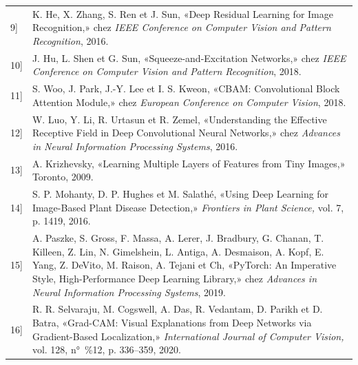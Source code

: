 \documentclass[
  12pt,
  a4paper,
]{report}
\begin{document}
\begin{longtable}[]{@{}
  >{\raggedright\arraybackslash}p{}
  >{\raggedright\arraybackslash}p{}@{}}
{[}9{]} & K. He, X. Zhang, S. Ren et J. Sun, «Deep Residual Learning for
Image Recognition,» chez \emph{IEEE Conference on Computer Vision and
Pattern Recognition}, 2016. \\
{[}10{]} & J. Hu, L. Shen et G. Sun, «Squeeze-and-Excitation Networks,»
chez \emph{IEEE Conference on Computer Vision and Pattern Recognition},
2018. \\
{[}11{]} & S. Woo, J. Park, J.-Y. Lee et I. S. Kweon, «CBAM:
Convolutional Block Attention Module,» chez \emph{European Conference on
Computer Vision}, 2018. \\
{[}12{]} & W. Luo, Y. Li, R. Urtasun et R. Zemel, «Understanding the
Effective Receptive Field in Deep Convolutional Neural Networks,» chez
\emph{Advances in Neural Information Processing Systems}, 2016. \\
{[}13{]} & A. Krizhevsky, «Learning Multiple Layers of Features from
Tiny Images,» Toronto, 2009. \\
{[}14{]} & S. P. Mohanty, D. P. Hughes et M. Salathé, «Using Deep
Learning for Image-Based Plant Disease Detection,» \emph{Frontiers in
Plant Science,} vol. 7, p. 1419, 2016. \\
{[}15{]} & A. Paszke, S. Gross, F. Massa, A. Lerer, J. Bradbury, G.
Chanan, T. Killeen, Z. Lin, N. Gimelshein, L. Antiga, A. Desmaison, A.
Kopf, E. Yang, Z. DeVito, M. Raison, A. Tejani et Ch, «PyTorch: An
Imperative Style, High-Performance Deep Learning Library,» chez
\emph{Advances in Neural Information Processing Systems}, 2019. \\
{[}16{]} & R. R. Selvaraju, M. Cogswell, A. Das, R. Vedantam, D. Parikh
et D. Batra, «Grad-CAM: Visual Explanations from Deep Networks via
Gradient-Based Localization,» \emph{International Journal of Computer
Vision,} vol. 128, n°~\%12, p. 336--359, 2020. \\
\end{longtable}
\end{document}
